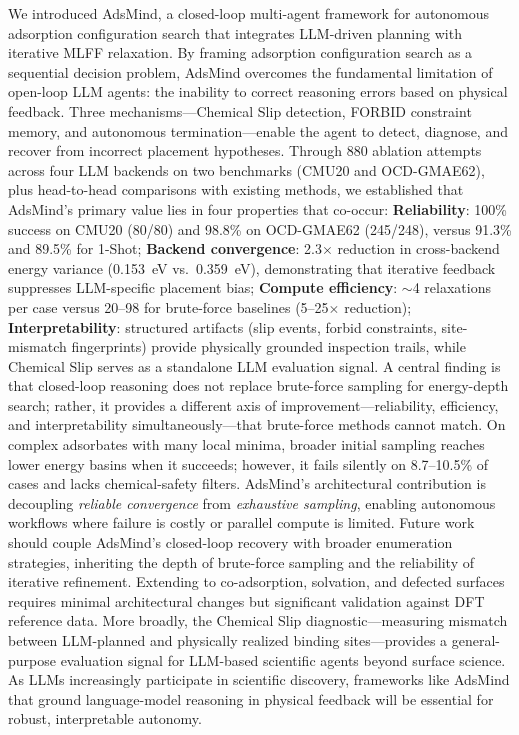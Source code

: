 We introduced AdsMind, a closed-loop multi-agent framework for autonomous adsorption configuration search that integrates LLM-driven planning with iterative MLFF relaxation.
By framing adsorption configuration search as a sequential decision problem, AdsMind overcomes the fundamental limitation of open-loop LLM agents: the inability to correct reasoning errors based on physical feedback.
Three mechanisms---Chemical Slip detection, FORBID constraint memory, and autonomous termination---enable the agent to detect, diagnose, and recover from incorrect placement hypotheses.
Through 880 ablation attempts across four LLM backends on two benchmarks (CMU20 and OCD-GMAE62), plus head-to-head comparisons with existing methods, we established that AdsMind's primary value lies in four properties that co-occur: \textbf{Reliability}: 100\% success on CMU20 (80/80) and 98.8\% on OCD-GMAE62 (245/248), versus 91.3\% and 89.5\% for 1-Shot; \textbf{Backend convergence}: 2.3$\times$ reduction in cross-backend energy variance (0.153~eV vs.\ 0.359~eV), demonstrating that iterative feedback suppresses LLM-specific placement bias; \textbf{Compute efficiency}: $\sim$4 relaxations per case versus 20--98 for brute-force baselines (5--25$\times$ reduction); \textbf{Interpretability}: structured artifacts (slip events, forbid constraints, site-mismatch fingerprints) provide physically grounded inspection trails, while Chemical Slip serves as a standalone LLM evaluation signal.
A central finding is that closed-loop reasoning does not replace brute-force sampling for energy-depth search; rather, it provides a different axis of improvement---reliability, efficiency, and interpretability simultaneously---that brute-force methods cannot match.
On complex adsorbates with many local minima, broader initial sampling reaches lower energy basins when it succeeds; however, it fails silently on 8.7--10.5\% of cases and lacks chemical-safety filters.
AdsMind's architectural contribution is decoupling \textit{reliable convergence} from \textit{exhaustive sampling}, enabling autonomous workflows where failure is costly or parallel compute is limited.
Future work should couple AdsMind's closed-loop recovery with broader enumeration strategies, inheriting the depth of brute-force sampling and the reliability of iterative refinement.
Extending to co-adsorption, solvation, and defected surfaces requires minimal architectural changes but significant validation against DFT reference data.
More broadly, the Chemical Slip diagnostic---measuring mismatch between LLM-planned and physically realized binding sites---provides a general-purpose evaluation signal for LLM-based scientific agents beyond surface science.
As LLMs increasingly participate in scientific discovery, frameworks like AdsMind that ground language-model reasoning in physical feedback will be essential for robust, interpretable autonomy.
